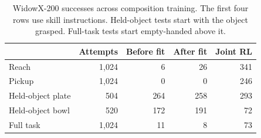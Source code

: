 \begin{table}[!htb]
\caption{WidowX-200 successes across composition training. The first four rows use skill instructions. Held-object tests start with the object grasped. Full-task tests start empty-handed above it.}
\label{tab:wx200_handoffs}\centering\small
\setlength{\tabcolsep}{4pt}
\begin{tabular}{@{}lrrrr@{}}\toprule
 & Attempts & Before fit & After fit & Joint RL\\\midrule
Reach & 1,024 & 6 & 26 & 341\\
Pickup & 1,024 & 0 & 0 & 246\\
Held-object plate & 504 & 264 & 258 & 293\\
Held-object bowl & 520 & 172 & 191 & 72\\
Full task & 1,024 & 11 & 8 & 73\\\bottomrule
\end{tabular}
\end{table}
